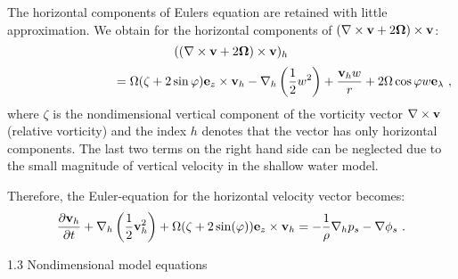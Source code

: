 The horizontal components of {\sc Euler}s equation are retained
with little approximation.
We obtain for the horizontal components of $(\nabla \times {\bf v} + 2 \mbox{\boldmath $\Omega$}) \times {\bf v}$:
{\setlength{\mathindent}{1em}
\begin{equation}
((\nabla \times {\bf v} + 2 \mbox{\boldmath $\Omega$}) \times {\bf v})_h
\end{equation}
\[
\hspace{3.cm}=\Omega (\zeta + 2 \sin \varphi) {\bf e}_z \times {\bf v}_h 
- \nabla_h \left(\frac 1 2 w ^2 \right) + \frac {{\bf v}_h w} r
+ 2 \Omega \cos {\varphi} w {\bf e}_{\lambda}~,
\]
}
where $\zeta$ is the nondimensional vertical component of the vorticity vector $\nabla \times {\bf v}$ 
(relative vorticity) and the index $h$ denotes that the vector has only horizontal components.
The last two terms on the right hand side can be neglected due to the small magnitude of
vertical velocity in the shallow water model.

Therefore, the  {\sc Euler}-equation for the horizontal velocity vector becomes:
\begin{equation}
\frac {\partial {\bf v}_h} {\partial t} + \nabla_h \left(\frac 1 2 {\bf v}_h^2 \right)
+ \Omega (\zeta + 2 \sin (\varphi)) {\bf e}_z \times {\bf v}_h
= - \frac 1 {\rho} \nabla_h p_s - \nabla \phi_s ~.
\end{equation}

1.3 Nondimensional model equations

\nopagebreak[4]

